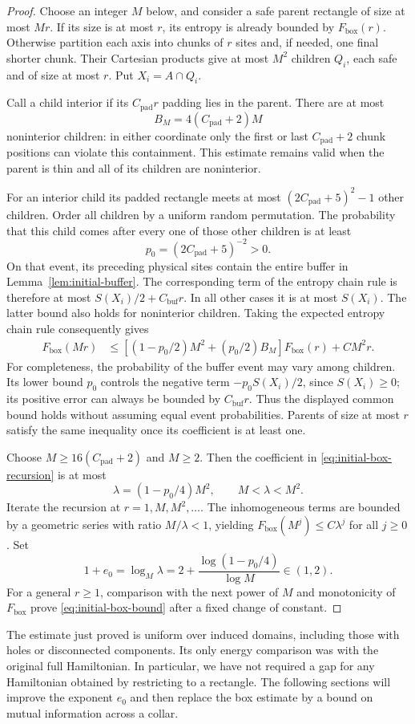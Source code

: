 \begin{proof}
Choose an integer $M$ below, and consider a safe parent rectangle of
size at most $Mr$.  If its size is at most $r$, its entropy is already
bounded by $F_{\mathrm{box}}(r)$.  Otherwise partition each axis into
chunks of $r$ sites and, if needed, one final shorter chunk.  Their
Cartesian products give at most $M^2$ children $Q_i$, each safe and
of size at most $r$.  Put $X_i=A\cap Q_i$.

Call a child interior if its $C_{\mathrm{pad}}r$ padding lies in the
parent.  There are at most
\[
 B_M=4(C_{\mathrm{pad}}+2)M
\]
noninterior children: in either coordinate only the first or last
$C_{\mathrm{pad}}+2$ chunk positions can violate this containment.
This estimate remains valid when the parent is thin and all of its
children are noninterior.

For an interior child its padded rectangle meets at most
$(2C_{\mathrm{pad}}+5)^2-1$ other children.  Order all children by a
uniform random permutation.  The probability that this child comes
after every one of those other children is at least
\[
 p_0=(2C_{\mathrm{pad}}+5)^{-2}>0.
\]
On that event, its preceding physical sites contain the entire
buffer in Lemma~\ref{lem:initial-buffer}.  The corresponding term of
the entropy chain rule is therefore at most
$S(X_i)/2+C_{\mathrm{buf}}r$.  In all other cases it is at most
$S(X_i)$.  The latter bound also holds for noninterior children.
Taking the expected entropy chain rule consequently gives
\begin{align}
 F_{\mathrm{box}}(Mr)
 &\le\left[(1-p_0/2)M^2+(p_0/2)B_M\right]
          F_{\mathrm{box}}(r)+C M^2r.
 \label{eq:initial-box-recursion}
\end{align}
For completeness, the probability of the buffer event may vary among
children.  Its lower bound $p_0$ controls the negative term
$-p_0S(X_i)/2$, since $S(X_i)\ge0$; its positive error can always be
bounded by $C_{\mathrm{buf}}r$.  Thus the displayed common bound
holds without assuming equal event probabilities.  Parents of size
at most $r$ satisfy the same inequality once its coefficient is at
least one.

Choose $M\ge16(C_{\mathrm{pad}}+2)$ and $M\ge2$.  Then the coefficient
in \eqref{eq:initial-box-recursion} is at most
\[
 \lambda=(1-p_0/4)M^2,
 \qquad M<\lambda<M^2.
\]
Iterate the recursion at $r=1,M,M^2,\ldots$.  The inhomogeneous terms
are bounded by a geometric series with ratio $M/\lambda<1$, yielding
$F_{\mathrm{box}}(M^j)\le C\lambda^j$ for all $j\ge0$.
Set
\[
 1+e_0=\log_M\lambda
       =2+\frac{\log(1-p_0/4)}{\log M}\in(1,2).
\]
For a general $r\ge1$, comparison with the next power of $M$ and
monotonicity of $F_{\mathrm{box}}$ prove
\eqref{eq:initial-box-bound} after a fixed change of constant.
\end{proof}

The estimate just proved is uniform over induced domains, including
those with holes or disconnected components.  Its only energy
comparison was with the original full Hamiltonian.  In particular,
we have not required a gap for any Hamiltonian obtained by restricting
to a rectangle.  The following sections will improve the exponent
$e_0$ and then replace the box estimate by a bound on mutual information
across a collar.
